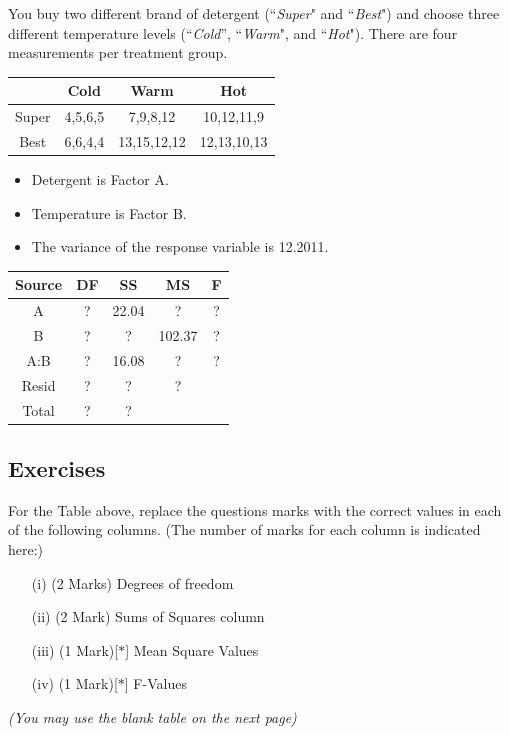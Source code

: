 \documentclass[a4paper,12pt]{article}
\begin{document}
	
	\noindent You buy two different brand of detergent (``\textit{Super}" and ``\textit{Best}") and choose three different temperature levels (``\textit{Cold}”, ``\textit{Warm}", and ``\textit{Hot}"). There are four measurements per treatment group.
	{
		\Large
		\begin{center}
			\begin{tabular}{|c||c|c|c|}
				\hline
				& Cold & Warm & Hot  \\ \hline \hline
				Super &  4,5,6,5    & 7,9,8,12     &  10,12,11,9    \\  \hline
				Best  &  6,6,4,4    & 13,15,12,12    & 12,13,10,13     \\  \hline
			\end{tabular} 
		\end{center}
	}
	\begin{itemize}
		\item Detergent is Factor A.
		\item Temperature is Factor B.
		\item The variance of the response variable is 12.2011.
	\end{itemize}
	{
		\Large
		\begin{center}
			\begin{tabular}{|c|c|c|c|c|}\hline
				Source & DF & SS & MS & F \\ \hline
				A  & \phantom{spa}? \phantom{spa}  & 22.04 & \phantom{spa}? \phantom{spa} & \phantom{spa}? \phantom{spa} \\ \hline
				B  &\phantom{spa}? \phantom{spa} & \phantom{spa}? \phantom{spa}  & 102.37 & \phantom{spa}? \phantom{spa} \\ \hline
				A:B  & \phantom{spa}? \phantom{spa}& 16.08 & \phantom{spa}? \phantom{spa} & \phantom{spa}? \phantom{spa} \\ \hline
				Resid & \phantom{spa}? \phantom{spa}& \phantom{spa}? \phantom{spa} & \phantom{spa}? \phantom{spa} & \\ \hline \hline
				Total & \phantom{spa}? \phantom{spa}&\phantom{spa}? \phantom{spa}  & \phantom{spa} & \\  \hline
			\end{tabular} 
		\end{center}
	}
	\subsection*{Exercises}
	For the Table above, replace the questions marks with the correct values in each of the following columns. (The number of marks for each column is indicated here:)
	\begin{itemize}
		\item[(i)] (2 Marks) Degrees of freedom 
		\item[(ii)](2 Mark) Sums of Squares column
		\item[(iii)](1 Mark)[$\ast$] Mean Square Values
		\item[(iv)](1 Mark)[$\ast$] F-Values
	\end{itemize}
	\textit{(You may use the blank table on the next page)}
\end{document}
